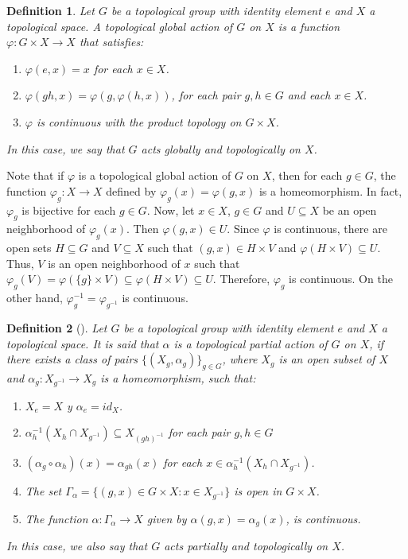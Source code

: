 \documentclass[sn-mathphys-num]{sn-jnl}%
\theoremstyle{thmstyleone}%
\theoremstyle{thmstyletwo}%
\theoremstyle{thmstylethree}%
\newtheorem{definition}{Definition}%
\begin{document}
\begin{definition}
Let $ G $ be a topological group with identity element $ e $ and $ X $  a topological space. A topological global  action of $ G $ on $ X $ is a function $ \varphi: G \times X \to X $ that satisfies:
\begin{enumerate}
  \item $ \varphi (e, x) = x $ for each $ x \in X $.
  \item $ \varphi (gh, x) = \varphi (g, \varphi (h, x)) $, for each pair $ g, h \in G $ and each $ x \in X $.
  \item $ \varphi $ is continuous with the product topology on $ G \times X $.
\end{enumerate}
In this case, we say that $ G $ acts globally and topologically on $ X $.\\
\end{definition}

Note that if $ \varphi $ is a topological global  action of $ G $ on $ X $, then for each $ g \in G $, the function $ \varphi_g: X \to X $ defined by $ \varphi_g (x) = \varphi (g, x) $ is a homeomorphism.
In fact, $ \varphi_g $ is bijective for each $ g \in G$.
Now, let $ x \in X $, $ g \in G $ and $ U \subseteq X $ be an open neighborhood of $ \varphi_g (x) $. Then $ \varphi (g, x) \in U$.
Since $ \varphi $ is continuous, there are open sets $ H \subseteq G $ and $ V \subseteq X $ such that $ (g, x) \in H \times V $ and $ \varphi (H \times V) \subseteq U $.
Thus, $ V $ is an open neighborhood of $ x $ such that $ \varphi_g (V) = \varphi (\{g \} \times V) \subseteq \varphi (H \times V) \subseteq U $. Therefore, $ \varphi_g $ is continuous.
On the other hand,  $ \varphi_g^{-1} = \varphi_ {g^{- 1}} $ is continuous.\\



\begin{definition}[\cite{Abadie2}]\label{defpartop}
Let $ G $ be a topological group with identity element $ e $ and $ X $  a topological space. It is said that $ \alpha $ is a topological  partial action of $ G $ on $ X $, if there exists a class of pairs $ \{(X_g, \alpha_g) \}_{g \in G}$, where $ X_g $ is an open subset of $ X $ and $ \alpha_g: X_ {g^{- 1}} \to X_g $ is a homeomorphism, such that:
\begin{enumerate}
\item $X_e = X$ y $\alpha_e=id_X$.
\item $\alpha^{-1}_h(X_h\cap X_{g^{-1}})\subseteq X_{(gh)^{-1}}$ for each pair $ g, h \in G $
\item $(\alpha_g\circ \alpha_h)(x) = \alpha_{gh}(x)$  for each  $x\in \alpha^{-1}_h (X_h\cap X_{g^{-1}})$.
\item The set $\Gamma_\alpha=\{(g,x)\in G\times X: x\in X_{g^{-1}}\}$ is open in $G \times X$.
\item The function $\alpha:\Gamma_\alpha\to X$  given by $\alpha(g,x)=\alpha_g(x)$,  is continuous.
  \end{enumerate}
In this case, we also say that $ G $ acts partially and topologically on $ X $.\\
\end{definition}
\end{document}

